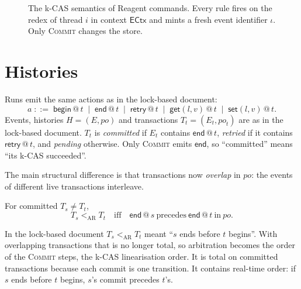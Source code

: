 \documentclass[manuscript,nonacm]{acmart}
\makeatletter
\theoremstyle{acmdefinition}
\newcommand{\unit}{()}
\newcommand{\bbegin}{\textsf{begin}}
\newcommand{\eend}{\textsf{end}}
\newcommand{\retry}{\textsf{retry}}
\newcommand{\ectx}{\mathsf{ECtx}}
\newcommand{\ehole}[1]{\ectx[[\, #1 \,]]}
\newcommand{\getev}[3]{\textsf{get}(#1,#2)\,@\,#3}
\newcommand{\setev}[3]{\textsf{set}(#1,#2)\,@\,#3}
\newcommand{\eid}{\iota}
\newcommand{\ev}[2]{\langle #1,\, #2 \rangle}
\newcommand{\isfresh}{\ \text{fresh}}
\newcommand{\po}{\mathit{po}}
\newcommand{\Lg}{\Lambda}                         %
\newcommand{\kcas}[1]{\mathsf{kcas}(#1)}
\newcommand{\kfail}[2]{#1 \vdash \kcas{#2} \Downarrow \mathsf{fail}}
\newcommand{\txs}{\Theta}
\newcommand{\cfg}[3]{\langle #1,\, #2,\, #3 \rangle}
\makeatother
\begin{document}
\begin{figure}[ht]
\caption{The k-CAS semantics of Reagent commands. Every rule fires on the redex
of thread $i$ in context $\ectx$ and mints a fresh event identifier $\eid$. Only
\textsc{Commit} changes the store.}
\label{fig:rules}
\end{figure}

\section{Histories}
\label{sec:history}

Runs emit the same actions as in the lock-based document:
\[
a \;::=\; \bbegin\,@\,t \;\mid\; \eend\,@\,t \;\mid\; \retry\,@\,t
      \;\mid\; \getev{l}{v}{t} \;\mid\; \setev{l}{v}{t}.
\]
Events, histories $H = (E,\po)$ and transactions $T_t = (E_t,\po_t)$ are as in
the lock-based document. $T_t$ is \emph{committed} if $E_t$ contains
$\eend\,@\,t$, \emph{retried} if it contains $\retry\,@\,t$,
and \emph{pending} otherwise. Only \textsc{Commit} emits $\eend$, so ``committed''
means ``its k-CAS succeeded''.

The main structural difference is that transactions now \emph{overlap} in
$\po$: the events of different live transactions interleave.

\begin{definition}[Arbitration]
For committed $T_s \neq T_t$,
\[
T_s <_{\mathrm{AR}} T_t \quad\text{iff}\quad
\eend\,@\,s \ \text{precedes}\ \eend\,@\,t \ \text{in}\ \po .
\]
\end{definition}
In the lock-based document $T_s <_{\mathrm{AR}} T_t$ meant ``$s$ ends before
$t$ begins''. With overlapping transactions that is no longer total, so
arbitration becomes the order of the \textsc{Commit} steps, the k-CAS
linearisation order. It is total on committed transactions because each commit
is one transition. It contains real-time order: if $s$ ends before $t$ begins,
$s$'s commit precedes $t$'s.
\end{document}
